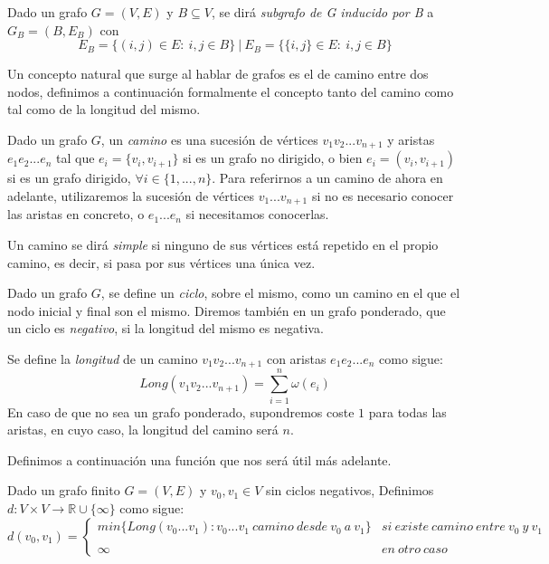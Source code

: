 \begin{definicion}
	Dado un grafo $G=(V,E)$ y $B\subseteq V$, se dirá \textit{subgrafo de G inducido por B} a $G_B=(B,E_B)$ con
	$$E_B=\{(i,j)\in E:\ i,j\in B\}\ |\ E_B=\{\{i,j\}\in E:\ i,j\in B\}$$
\end{definicion}

Un concepto natural que surge al hablar de grafos es el de camino entre dos nodos, definimos a continuación formalmente el concepto tanto del camino como tal como de la longitud del mismo.

\begin{definicion}
	Dado un grafo $G$, un \textit{camino} es una sucesión de vértices $v_1v_2...v_{n+1}$ y aristas $e_1e_2...e_n$ tal que $e_i=\{v_i,v_{i+1}\}$ si es un grafo no dirigido, o bien $e_i=(v_i,v_{i+1})$ si es un grafo dirigido, $\forall i \in \{1,...,n\}$. Para referirnos a un camino de ahora en adelante, utilizaremos la sucesión de vértices $v_1...v_{n+1}$ si no es necesario conocer las aristas en concreto, o $e_1...e_n$ si necesitamos conocerlas.
\end{definicion}

\begin{definicion}
	Un camino se dirá \textit{simple} si ninguno de sus vértices está repetido en el propio camino, es decir, si pasa por sus vértices una única vez.
\end{definicion}

\begin{definicion}
	Dado un grafo $G$, se define un \textit{ciclo}, sobre el mismo, como un camino en el que el nodo inicial y final son el mismo. Diremos también en un grafo ponderado, que un ciclo es \textit{negativo}, si la longitud del mismo es negativa.
\end{definicion}

\begin{definicion}
	Se define la \textit{longitud} de un camino $v_1v_2...v_{n+1}$ con aristas $e_1e_2...e_n$ como sigue: 
	$$Long(v_1v_2...v_{n+1}) = \sum_{i=1}^{n}\omega(e_i)$$
	En caso de que no sea un grafo ponderado, supondremos coste $1$ para todas las aristas, en cuyo caso, la longitud del camino será $n$.
\end{definicion}

Definimos a continuación una función que nos será útil más adelante.

\begin{definicion}\label{def:dist}
	Dado un grafo finito $G=(V,E)$ y $v_0,v_1\in V$ sin ciclos negativos, Definimos $d:V\times V \rightarrow \mathbb{R}\cup \{\infty\}$ como sigue:
	$$d(v_0,v_1)= \left\{ \begin{array}{lcc}
		min\{Long(v_0...v_1) : v_0...v_1\ camino\ desde\ v_0\ a\ v_1\} &   si\ existe\ camino\ entre\ v_0\ y\ v_1 \\
		\\ \infty &  en\ otro\ caso
	\end{array}
	\right.$$
\end{definicion}

